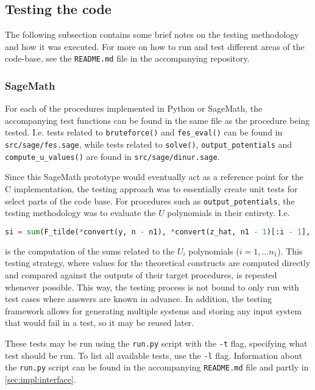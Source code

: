 \subsection{Testing the code}
The following subsection contains some brief notes on the testing methodology and how it was executed. For more on how to run and test different areas of the code-base, see the \texttt{README.md} file in the accompanying repository.

\subsubsection{SageMath}

For each of the procedures implemented in Python or SageMath, the accompanying test functions can be found in the same file as the procedure being tested. I.e. tests related to \texttt{bruteforce()} and \texttt{fes\_eval()} can be found in \texttt{src/sage/fes.sage}, while tests related to \texttt{solve()}, \texttt{output\_potentials} and \texttt{compute\_u\_values()} are found in \texttt{src/sage/dinur.sage}.

Since this SageMath prototype would eventually act as a reference point for the C implementation, the testing approach was to essentially create unit tests for select parts of the code base. For procedures such as \texttt{output\_potentials}, the testing methodology was to evaluate the $U$ polynomials in their entirety. I.e.
\begin{lstlisting}[language=Python,style=mystyle]
si = sum(F_tilde(*convert(y, n - n1), *convert(z_hat, n1 - 1)[:i - 1], 0, *convert(z_hat, n1 - 1)[i - 1:]) for z_hat in range(2^(n1 - 1)))
\end{lstlisting}
is the computation of the sums related to the $U_i$ polynomials ($i = 1, \dots n_1$). This testing strategy, where values for the theoretical constructs are computed directly and compared against the outputs of their target procedures, is repeated whenever possible. This way, the testing process is not bound to only run with test cases where answers are known in advance. In addition, the testing framework allows for generating multiple systems and storing any input system that would fail in a test, so it may be reused later.

These tests may be run using the \texttt{run.py} script with the \texttt{-t} flag, specifying what test should be run. To list all available tests, use the \texttt{-l} flag. Information about the \texttt{run.py} script can be found in the accompanying \texttt{README.md} file and partly in \cref{sec:impl:interface}.

